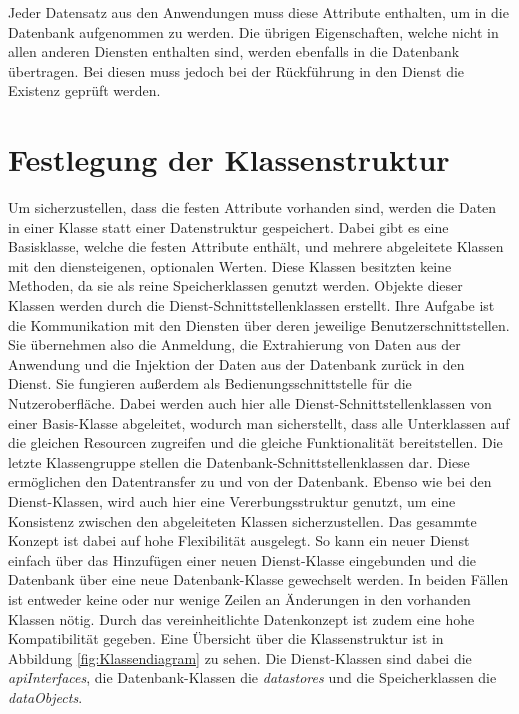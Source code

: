 Jeder Datensatz aus den Anwendungen muss diese Attribute enthalten, um in die Datenbank aufgenommen zu werden. Die übrigen Eigenschaften, welche nicht in allen anderen Diensten enthalten sind, werden ebenfalls in die Datenbank übertragen. Bei diesen muss jedoch bei der Rückführung in den Dienst die Existenz geprüft werden.

\section{Festlegung der Klassenstruktur}

Um sicherzustellen, dass die festen Attribute vorhanden sind, werden die Daten in einer Klasse statt einer Datenstruktur gespeichert. Dabei gibt es eine Basisklasse, welche die festen Attribute enthält, und mehrere abgeleitete Klassen mit den diensteigenen, optionalen Werten. Diese Klassen besitzten keine Methoden, da sie als reine Speicherklassen genutzt werden. Objekte dieser Klassen werden durch die Dienst-Schnittstellenklassen erstellt. Ihre Aufgabe ist die Kommunikation mit den Diensten über deren jeweilige Benutzerschnittstellen. Sie übernehmen also die Anmeldung, die Extrahierung von Daten aus der Anwendung und die Injektion der Daten aus der Datenbank zurück in den Dienst. Sie fungieren außerdem als Bedienungsschnittstelle für die Nutzeroberfläche. Dabei werden auch hier alle Dienst-Schnittstellenklassen von einer Basis-Klasse abgeleitet, wodurch man sicherstellt, dass alle Unterklassen auf die gleichen Resourcen zugreifen und die gleiche Funktionalität bereitstellen. Die letzte Klassengruppe stellen die Datenbank-Schnittstellenklassen dar. Diese ermöglichen den Datentransfer zu und von der Datenbank. Ebenso wie bei den Dienst-Klassen, wird auch hier eine Vererbungsstruktur genutzt, um eine Konsistenz zwischen den abgeleiteten Klassen sicherzustellen. Das gesammte Konzept ist dabei auf hohe Flexibilität ausgelegt. So kann ein neuer Dienst einfach über das Hinzufügen einer neuen Dienst-Klasse eingebunden und die Datenbank über eine neue Datenbank-Klasse gewechselt werden. In beiden Fällen ist entweder keine oder nur wenige Zeilen an Änderungen in den vorhanden Klassen nötig. Durch das vereinheitlichte Datenkonzept ist zudem eine hohe Kompatibilität gegeben. Eine Übersicht über die Klassenstruktur ist in Abbildung \ref{fig:Klassendiagram} zu sehen. Die Dienst-Klassen sind dabei die \textit{apiInterfaces}, die Datenbank-Klassen die \textit{datastores} und die Speicherklassen die \textit{dataObjects}.\\

